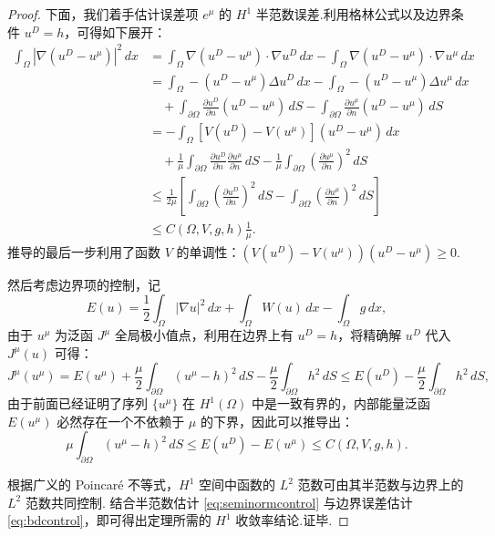 \begin{proof}
下面，我们着手估计误差项 $e^{\mu}$ 的 $H^1$ 半范数误差.利用格林公式以及边界条件 $u^D = h$，可得如下展开：
\begin{equation}\label{eq:seminormcontrol}
\begin{aligned}
\int_{\Omega}|\nabla(u^{D}-u^{\mu})|^{2}\,dx &= \int_{\Omega}\nabla (u^{D}-u^{\mu}) \cdot \nabla u^{D}\,dx - \int_{\Omega}\nabla (u^{D}-u^{\mu}) \cdot \nabla u^{\mu}\,dx\\
&= \int_{\Omega} -(u^{D}-u^{\mu})\Delta u^{D}\,dx - \int_{\Omega} -(u^{D}-u^{\mu})\Delta u^{\mu}\,dx \\
&\quad + \int_{\partial \Omega}\frac{\partial u^{D}}{\partial n}(u^{D}-u^{\mu})\,dS - \int_{\partial \Omega}\frac{\partial u^{\mu}}{\partial n}(u^{D}-u^{\mu})\,dS\\
&= -\int_{\Omega} \left[V(u^{D})-V(u^{\mu})\right]\left(u^{D}-u^{\mu}\right)\,dx \\
&\quad + \frac{1}{\mu} \int_{\partial \Omega}\frac{\partial u^{D}}{\partial n}\frac{\partial u^{\mu}}{\partial n}\,dS - \frac{1}{\mu} \int_{\partial \Omega}\left(\frac{\partial u^{\mu}}{\partial n}\right)^{2}\,dS\\
&\leq \frac{1}{2\mu}\left[\int_{\partial \Omega}\left(\frac{\partial u^{D}}{\partial n}\right)^{2}\,dS - \int_{\partial \Omega}\left(\frac{\partial u^{\mu}}{\partial n}\right)^{2}\,dS \right] \\
&\leq C(\Omega,V,g,h)\frac{1}{\mu}.
\end{aligned}
\end{equation}
推导的最后一步利用了函数 $V$ 的单调性：$\left(V(u^{D})-V(u^{\mu})\right)\left(u^{D}-u^{\mu}\right) \geq 0$.

然后考虑边界项的控制，记
$$E(u)=\frac{1}{2}\int_{\Omega} |\nabla u|^2 \, dx + \int_{\Omega} W(u) \, dx - \int_{\Omega} g\, dx,$$
由于 $u^{\mu}$ 为泛函 $J^{\mu}$ 全局极小值点，利用在边界上有 $u^{D}=h$，将精确解 $u^{D}$ 代入 $J^{\mu}(u)$ 可得：
$$J^{\mu}(u^{\mu})=E(u^{\mu}) + \frac{\mu}{2}\int_{\partial \Omega} (u^{\mu} - h)^2 \, dS - \frac{\mu}{2}\int_{\partial \Omega} h^2 \, dS \leq E(u^{D})- \frac{\mu}{2}\int_{\partial \Omega} h^2 \, dS,$$
由于前面已经证明了序列 $\{u^{\mu}\}$ 在 $H^1(\Omega)$ 中是一致有界的，内部能量泛函 $E(u^{\mu})$ 必然存在一个不依赖于 $\mu$ 的下界，因此可以推导出：
\begin{equation}\label{eq:bdcontrol}
\mu\int_{\partial \Omega}(u^{\mu}-h)^{2}\,dS \leq E(u^{D})-E(u^{\mu}) \leq C(\Omega,V,g,h).
\end{equation}

根据广义的 Poincaré 不等式，$H^1$ 空间中函数的 $L^2$ 范数可由其半范数与边界上的 $L^2$ 范数共同控制.
结合半范数估计 \eqref{eq:seminormcontrol} 与边界误差估计\eqref{eq:bdcontrol}，即可得出定理所需的 $H^1$ 收敛率结论.证毕.
\end{proof}

